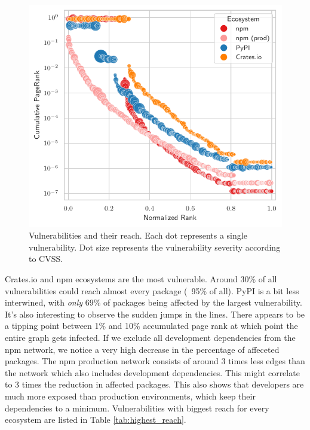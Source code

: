 \documentclass[9pt,twocolumn,twoside]{pnas-report}
\begin{document}
\begin{figure}[t]\centering%
	\includegraphics[width=\linewidth]{vuln_pagerank}
	\caption{Vulnerabilities and their reach. Each dot represents a single vulnerability. Dot size represents the vulnerability severity according to CVSS.  }
	\label{fig:reach}
\end{figure}

Crates.io and npm ecosystems are the most vulnerable.
Around 30\% of all vulnerabilities could reach almost every package (~95\% of all).
PyPI is a bit less interwined, with \textit{only} 69\% of packages being affected by the largest vulnerability.
It's also interesting to observe the sudden jumps in the lines.
There appears to be a tipping point between 1\% and 10\% accumulated page rank at which point the entire graph gets infected.
If we exclude all development dependencies from the npm network, we notice a very high decrease in the percentage of affeceted packages.
The npm production network consists of around 3 times less edges than the network which also includes development dependencies.
This might correlate to 3 times the reduction in affected packages.
This also shows that developers are much more exposed than production environments, which keep their dependencies to a minimum.
Vulnerabilities with biggest reach for every ecosystem are listed in Table \ref{tab:highest_reach}.
\end{document}
